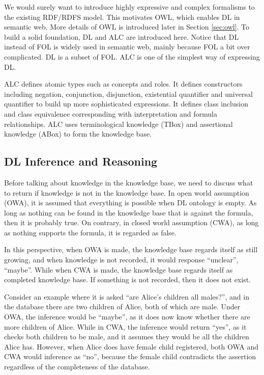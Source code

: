 We would surely want to introduce highly expressive and complex formalisms to the existing RDF/RDFS model. This motivates OWL, which enables DL in semantic web. More details of OWL is introduced later in Section \ref{sec:owl}. To build a solid foundation, DL and ALC are introduced here. Notice that DL instead of FOL is widely used in semantic web, mainly because FOL a bit over complicated. DL is a subset of FOL. ALC is one of the simplest way of expressing DL.

ALC defines atomic types such as concepts and roles. It defines constructors including negation, conjunction, disjunction, existential quantifier and universal quantifier to build up more sophisticated expressions. It defines class inclusion and class equivalence corresponding with interpretation and formula relationships. ALC uses terminological knowledge (TBox) and assertional knowledge (ABox) to form the knowledge base.

\subsection{DL Inference and Reasoning}

Before talking about knowledge in the knowledge base, we need to discuss what to return if knowledge is not in the knowledge base. In open world assumption (OWA), it is assumed that everything is possible when DL ontology is empty. As long as nothing can be found in the knowledge base that is against the formula, then it is probably true. On contrary, in closed world assumption (CWA), as long as nothing supports the formula, it is regarded as false.

In this perspective, when OWA is made, the knowledge base regards itself as still growing, and when knowledge is not recorded, it would response ``unclear'', ``maybe''. While when CWA is made, the knowledge base regards itself as completed knowledge base. If something is not recorded, then it does not exist.

Consider an example where it is asked ``are Alice's children all males?'', and in the database there are two children of Alice, both of which are male. Under OWA, the inference would be ``maybe'', as it does now know whether there are more children of Alice. While in CWA, the inference would return ``yes'', as it checks both children to be male, and it assumes they would be all the children Alice has. However, when Alice does have female child registered, both OWA and CWA would inference as ``no'', because the female child contradicts the assertion regardless of the completeness of the database.

